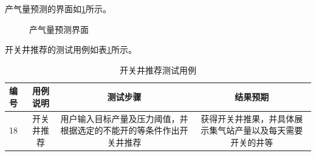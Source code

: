 产气量预测的界面如\ref{fig:prere}所示。

\begin{figure}
    \centering
    \hfil
    \caption{产气量预测界面}
    \label{fig:prere}
\end{figure}

开关井推荐的测试用例如表\ref{tab:opente}所示。

\begin{table}[H]
    \renewcommand{\arraystretch}{1.5}
    \centering
    \caption{开关井推荐测试用例}
    \label{tab:opente}
    \begin{tabular}{|l|c|c|c|}
        \hline
        编号 & 用例说明 &测试步骤 &结果预期 \\
        \hline
        18 & 开关井推荐 & 用户输入目标产量及压力阈值，并根据选定的不能开的等条件作出开关井推荐 & 获得开关井推果，并具体展示集气站产量以及每天需要开关的井等 \\
        \hline
    \end{tabular}
\end{table}

